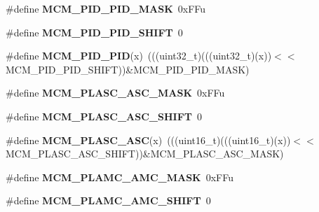 \begin{DoxyCompactItemize}
\item 
\#define {\bfseries M\+C\+M\+\_\+\+P\+I\+D\+\_\+\+P\+I\+D\+\_\+\+M\+A\+SK}~0x\+F\+Fu\hypertarget{group__MCM__Register__Masks_ga258efdcb0108c5e954d399d9a6e8883a}{}\label{group__MCM__Register__Masks_ga258efdcb0108c5e954d399d9a6e8883a}

\item 
\#define {\bfseries M\+C\+M\+\_\+\+P\+I\+D\+\_\+\+P\+I\+D\+\_\+\+S\+H\+I\+FT}~0\hypertarget{group__MCM__Register__Masks_ga579f075ec9afb3010ecf64eea087a04a}{}\label{group__MCM__Register__Masks_ga579f075ec9afb3010ecf64eea087a04a}

\item 
\#define {\bfseries M\+C\+M\+\_\+\+P\+I\+D\+\_\+\+P\+ID}(x)~(((uint32\+\_\+t)(((uint32\+\_\+t)(x))$<$$<$M\+C\+M\+\_\+\+P\+I\+D\+\_\+\+P\+I\+D\+\_\+\+S\+H\+I\+FT))\&M\+C\+M\+\_\+\+P\+I\+D\+\_\+\+P\+I\+D\+\_\+\+M\+A\+SK)\hypertarget{group__MCM__Register__Masks_ga6d4eaf3c8f87daf3e83324656d130eb6}{}\label{group__MCM__Register__Masks_ga6d4eaf3c8f87daf3e83324656d130eb6}

\item 
\#define {\bfseries M\+C\+M\+\_\+\+P\+L\+A\+S\+C\+\_\+\+A\+S\+C\+\_\+\+M\+A\+SK}~0x\+F\+Fu\hypertarget{group__MCM__Register__Masks_ga215cf860c41174735020a34e7ccf9590}{}\label{group__MCM__Register__Masks_ga215cf860c41174735020a34e7ccf9590}

\item 
\#define {\bfseries M\+C\+M\+\_\+\+P\+L\+A\+S\+C\+\_\+\+A\+S\+C\+\_\+\+S\+H\+I\+FT}~0\hypertarget{group__MCM__Register__Masks_ga88f833168fd51e1b3c950e21b00bbfc3}{}\label{group__MCM__Register__Masks_ga88f833168fd51e1b3c950e21b00bbfc3}

\item 
\#define {\bfseries M\+C\+M\+\_\+\+P\+L\+A\+S\+C\+\_\+\+A\+SC}(x)~(((uint16\+\_\+t)(((uint16\+\_\+t)(x))$<$$<$M\+C\+M\+\_\+\+P\+L\+A\+S\+C\+\_\+\+A\+S\+C\+\_\+\+S\+H\+I\+FT))\&M\+C\+M\+\_\+\+P\+L\+A\+S\+C\+\_\+\+A\+S\+C\+\_\+\+M\+A\+SK)\hypertarget{group__MCM__Register__Masks_gaaae648a9e1b6e2e44af89bb3a6881a54}{}\label{group__MCM__Register__Masks_gaaae648a9e1b6e2e44af89bb3a6881a54}

\item 
\#define {\bfseries M\+C\+M\+\_\+\+P\+L\+A\+M\+C\+\_\+\+A\+M\+C\+\_\+\+M\+A\+SK}~0x\+F\+Fu\hypertarget{group__MCM__Register__Masks_ga7988227df54012705c7f522f348214ee}{}\label{group__MCM__Register__Masks_ga7988227df54012705c7f522f348214ee}

\item 
\#define {\bfseries M\+C\+M\+\_\+\+P\+L\+A\+M\+C\+\_\+\+A\+M\+C\+\_\+\+S\+H\+I\+FT}~0\hypertarget{group__MCM__Register__Masks_gaa1b3153d0bf749f80fffacd948dd4bd4}{}\label{group__MCM__Register__Masks_gaa1b3153d0bf749f80fffacd948dd4bd4}


\end{DoxyCompactItemize}
